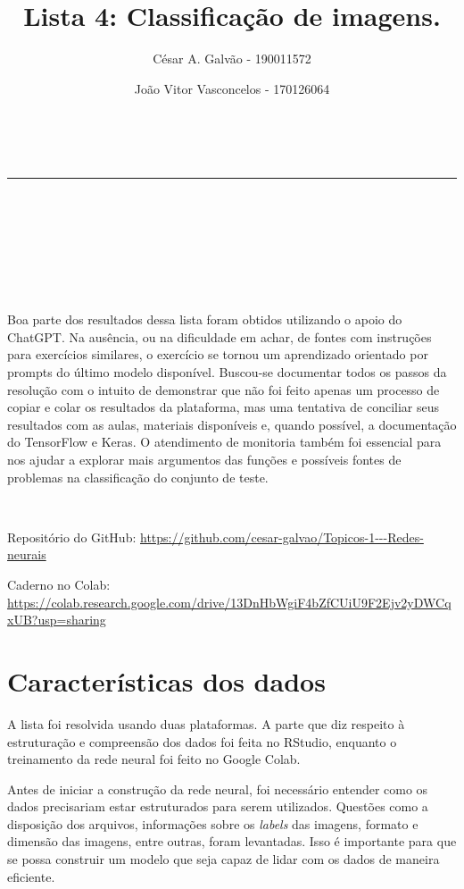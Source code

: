 \documentclass[
  a4paperpaper,
]{article}
\title{Lista 4: Classificação de imagens.}
\author{César A. Galvão - 190011572 \and João Vitor Vasconcelos -
170126064}
\date{}
\renewcommand*\contentsname{Índice}
\newcommand\contentsname{Índice}
\begin{document}
\maketitle

\renewcommand*\contentsname{Índice}
{
\hypersetup{linkcolor=}
\setcounter{tocdepth}{3}
\tableofcontents
}
~

\begin{center}\rule{0.5\linewidth}{0.5pt}\end{center}

~

~

~

~

Boa parte dos resultados dessa lista foram obtidos utilizando o apoio do
ChatGPT. Na ausência, ou na dificuldade em achar, de fontes com
instruções para exercícios similares, o exercício se tornou um
aprendizado orientado por prompts do último modelo disponível. Buscou-se
documentar todos os passos da resolução com o intuito de demonstrar que
não foi feito apenas um processo de copiar e colar os resultados da
plataforma, mas uma tentativa de conciliar seus resultados com as aulas,
materiais disponíveis e, quando possível, a documentação do TensorFlow e
Keras. O atendimento de monitoria também foi essencial para nos ajudar a
explorar mais argumentos das funções e possíveis fontes de problemas na
classificação do conjunto de teste.

~

Repositório do GitHub:
\url{https://github.com/cesar-galvao/Topicos-1---Redes-neurais}

Caderno no Colab:
\url{https://colab.research.google.com/drive/13DnHbWgiF4bZfCUiU9F2Ejv2yDWCqxUB?usp=sharing}

\newpage{}

\section{Características dos dados}\label{caracteruxedsticas-dos-dados}

A lista foi resolvida usando duas plataformas. A parte que diz respeito
à estruturação e compreensão dos dados foi feita no RStudio, enquanto o
treinamento da rede neural foi feito no Google Colab.

Antes de iniciar a construção da rede neural, foi necessário entender
como os dados precisariam estar estruturados para serem utilizados.
Questões como a disposição dos arquivos, informações sobre os
\emph{labels} das imagens, formato e dimensão das imagens, entre outras,
foram levantadas. Isso é importante para que se possa construir um
modelo que seja capaz de lidar com os dados de maneira eficiente.
\end{document}
